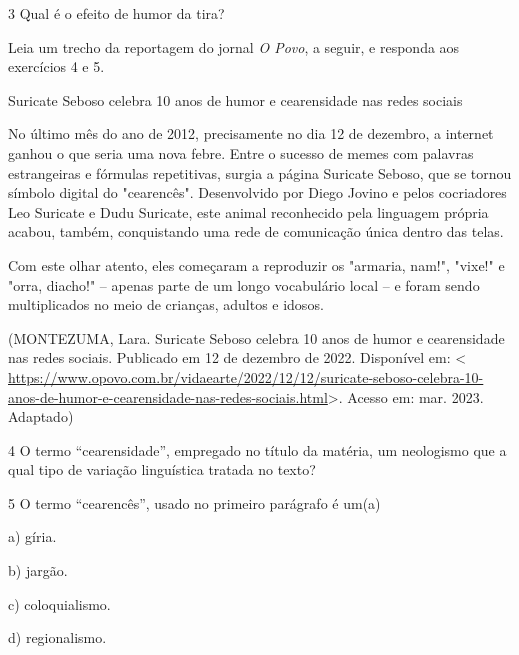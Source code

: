 {\num{3} Qual é o efeito de humor da tira?



Leia um trecho da reportagem do jornal \emph{O Povo}, a seguir, e
responda aos exercícios 4 e 5.

Suricate Seboso celebra 10 anos de humor e cearensidade nas redes
sociais

No último mês do ano de 2012, precisamente no dia 12 de dezembro, a
internet ganhou o que seria uma nova febre. Entre o sucesso de memes com
palavras estrangeiras e fórmulas repetitivas, surgia a página Suricate
Seboso, que se tornou símbolo digital do "cearencês". Desenvolvido por
Diego Jovino e pelos cocriadores Leo Suricate e Dudu Suricate, este
animal reconhecido pela linguagem própria acabou, também, conquistando
uma rede de comunicação única dentro das telas.

Com este olhar atento, eles começaram a reproduzir os "armaria, nam!",
"vixe!" e "orra, diacho!" -- apenas parte de um longo vocabulário local
-- e foram sendo multiplicados no meio de crianças, adultos e idosos.

(MONTEZUMA, Lara. Suricate Seboso celebra 10 anos de humor e
cearensidade nas redes sociais. Publicado em 12 de dezembro de 2022.
Disponível em: \textless{}
\url{https://www.opovo.com.br/vidaearte/2022/12/12/suricate-seboso-celebra-10-anos-de-humor-e-cearensidade-nas-redes-sociais.html}\textgreater.
Acesso em: mar. 2023. Adaptado)

\num{4} O termo ``cearensidade'', empregado no título da matéria, um
neologismo que a qual tipo de variação linguística tratada no texto?



\num{5} O termo ``cearencês'', usado no primeiro parágrafo é um(a)

a) gíria.

b) jargão.

c) coloquialismo.

d) regionalismo.


}
